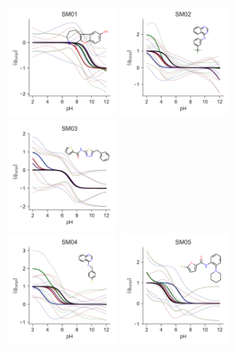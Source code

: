 \documentclass[9pt,lineno,final]{elife}
\begin{document}
    
\begin{figure}[hbt]
	\centering	
	\includegraphics[width=0.33\textwidth]{Reports/overview-SM01-titration-bootstrap-molecule.pdf}
	\includegraphics[width=0.33\textwidth]{Reports/overview-SM02-titration-bootstrap-molecule.pdf}
	\includegraphics[width=0.33\textwidth]{Reports/overview-SM03-titration-bootstrap-molecule.pdf}	 \\
    \includegraphics[width=0.33\textwidth]{Reports/overview-SM04-titration-bootstrap-molecule.pdf}
	\includegraphics[width=0.33\textwidth]{Reports/overview-SM05-titration-bootstrap-molecule.pdf}

\end{figure}
\end{document}
